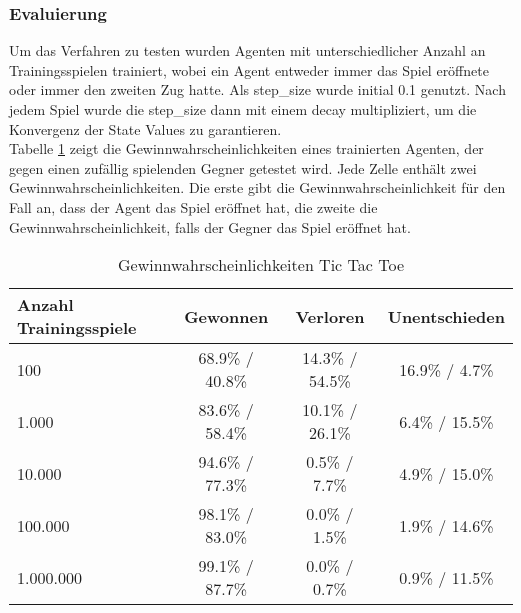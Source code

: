 \documentclass[11pt]{scrartcl}
\begin{document}
\subsubsection{Evaluierung}
Um das Verfahren zu testen wurden Agenten mit unterschiedlicher Anzahl an Trainingsspielen
trainiert, wobei ein Agent entweder immer das Spiel eröffnete oder immer den zweiten Zug
hatte. Als step\_size wurde initial 0.1 genutzt. Nach jedem Spiel wurde die step\_size
dann mit einem decay multipliziert, um die Konvergenz der State Values zu garantieren.\\
Tabelle \ref{tab:win_probability_tictactoe_begin} zeigt die Gewinnwahrscheinlichkeiten eines
trainierten Agenten, der gegen einen zufällig spielenden Gegner getestet wird. Jede Zelle
enthält zwei Gewinnwahrscheinlichkeiten. Die erste gibt die Gewinnwahrscheinlichkeit für
den Fall an, dass der Agent das Spiel eröffnet hat, die zweite die
Gewinnwahrscheinlichkeit, falls der Gegner das Spiel eröffnet hat.
\begin{table}[ht]
  \begin{center}
    \begin{tabular}{l | c | c | c}
      Anzahl Trainingsspiele & Gewonnen & Verloren & Unentschieden \\
      \hline
      100 & 68.9\% / 40.8\% & 14.3\% / 54.5\% & 16.9\% / 4.7\% \\
      1.000 & 83.6\% / 58.4\% & 10.1\% / 26.1\% & 6.4\% / 15.5\% \\
      10.000 & 94.6\% / 77.3\% & 0.5\% / 7.7\% & 4.9\% / 15.0\% \\
      100.000 & 98.1\% / 83.0\% & 0.0\% / 1.5\% & 1.9\% / 14.6\% \\
      1.000.000 & 99.1\% / 87.7\% & 0.0\% / 0.7\% & 0.9\% / 11.5\% \\
    \end{tabular}

    \caption[Gewinnwahrscheinlichkeiten Tic Tac Toe]{Gewinnwahrscheinlichkeiten Tic Tac
    Toe}
    \label{tab:win_probability_tictactoe_begin}
  \end{center}
\end{table}
\end{document}
